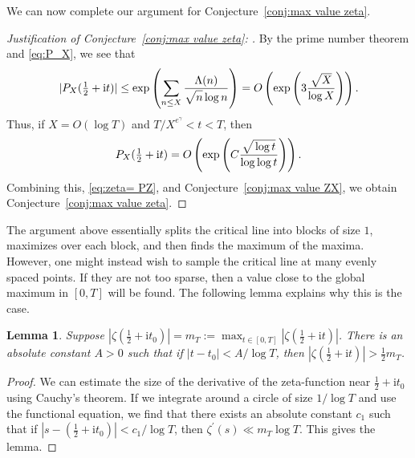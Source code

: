 \documentclass[10pt,reqno,twoside]{amsart}
\renewcommand{\i}{{\mathrm{i}}} %
\newtheorem{lemma}[theorem]{Lemma}
\numberwithin{equation}{section}
\numberwithin{theorem}{section}
\begin{document}
{{We can now complete our argument for  Conjecture~\ref{conj:max value zeta}.
\begin{proof}[Justification of Conjecture~\ref{conj:max value zeta}: ]
By the prime number theorem and \eqref{eq:P_X}, we see that
\begin{equation}
|P_X(\tfrac12+\i t)| \leq \exp\left(\sum_{n\leq X}
\frac{\Lambda(n)}{\sqrt{\mathstrut n} \log n} \right)=
O\left(\exp\left(3 \frac{ \sqrt{\mathstrut X}}{\log X}\right)\right) .
\end{equation}
Thus, if  $X=O(\log T)$ and $T /X^{e^\gamma} < t< T$, then
\begin{equation}
P_X(\tfrac12+\i t)=O\left(
        \exp\left(C\frac{\sqrt{\mathstrut \log t}}{\log \log t}\right)
        \right).
\end{equation}
Combining this,  \eqref{eq:zeta= PZ}, and Conjecture~\ref{conj:max value ZX},
we obtain Conjecture~\ref{conj:max value zeta}.
\end{proof}



The argument above essentially splits the critical line into blocks
of size $1$, maximizes over each block, and then finds the maximum
of the maxima. However, one might instead wish to sample the critical
line at many evenly spaced points. If they are not too sparse, then
a value close to the global maximum in $[0,T]$ will be found.
The following lemma explains why this is the case.

\begin{lemma}\label{lem:zetastaysbig}
Suppose
$|\zeta(\frac12+\i t_0)|=m_T:=\max_{t\in [0,T]} |\zeta(\frac12+\i t)|$.
There is an absolute constant $A>0$ such that if
$|t-t_0|<A/\log T$, then $|\zeta(\frac12+\i t)| > \frac12 m_T$.
\end{lemma}

\begin{proof}
We can
estimate the size of the derivative of the zeta-function near
$\frac12+\i t_0$ using Cauchy's theorem.
If we integrate around a circle of size $1/\log T$ and use the
functional equation, we find
that there exists an absolute constant $c_1$ such that if
$|s-(\frac12+\i t_0)|<c_1/\log T$, then $\zeta^{\prime}(s) \ll m_T
\log T$. This gives the lemma.
\end{proof}

}}
\end{document}
